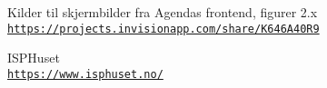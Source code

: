 \begin{thebibliography}{9}
	
	Kilder til skjermbilder fra Agendas frontend, figurer 2.x
	\\\texttt{\url{https://projects.invisionapp.com/share/K646A40R9}}
	
	ISPHuset
	\\\texttt{\url{https://www.isphuset.no/}}
	
\end{thebibliography}
